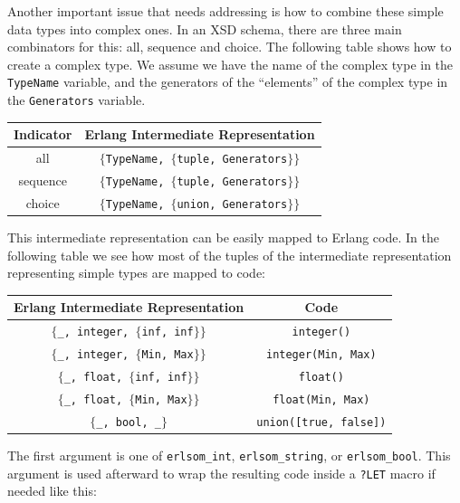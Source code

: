 \documentclass[copyright]{eptcs}
\newcommand{\LET}{\texttt{?LET}\xspace}
\begin{document}
Another important issue that needs addressing is how to combine these
simple data types into complex ones. In an XSD schema, there are three
main combinators for this: all, sequence and choice. The following
table shows how to create a complex type. We assume we have the name
of the complex type in the \texttt{TypeName} variable, and the
generators of the ``elements'' of the complex type in the
\texttt{Generators} variable.

\begin{center}\footnotesize
  \begin{tabular}{cc}
    \toprule
    Indicator & Erlang Intermediate Representation \\
    \midrule
    all & \texttt{$\{$TypeName, $\{$tuple, Generators$\}\}$}\\
    sequence & \texttt{$\{$TypeName, $\{$tuple, Generators$\}\}$}\\
    choice & \texttt{$\{$TypeName, $\{$union, Generators$\}\}$}\\
    \bottomrule
  \end{tabular}
\end{center}

This intermediate representation can be easily mapped to Erlang code.
In the following table we see how most of the tuples of the
intermediate representation representing simple types are mapped to
code:
\begin{center}\footnotesize
  \begin{tabular}{cc}
    \toprule
    Erlang Intermediate Representation & Code\\
    \midrule
    \texttt{$\{$\_, integer, $\{$inf, inf$\}\}$} & \texttt{integer()}\\
    \texttt{$\{$\_, integer, $\{$Min, Max$\}\}$} & \texttt{integer(Min, Max)}\\
    \texttt{$\{$\_, float, $\{$inf, inf$\}\}$} & \texttt{float()}\\
    \texttt{$\{$\_, float, $\{$Min, Max$\}\}$} & \texttt{float(Min, Max)}\\
    \texttt{$\{$\_, bool, \_$\}$} & \texttt{union([true, false])}\\
    \bottomrule
  \end{tabular}
\end{center}

The first argument is one of \texttt{erlsom\_int},
\texttt{erlsom\_string}, or \texttt{erlsom\_bool}. This argument is
used afterward to wrap the resulting code inside a \LET macro if
needed like this:
\end{document}
